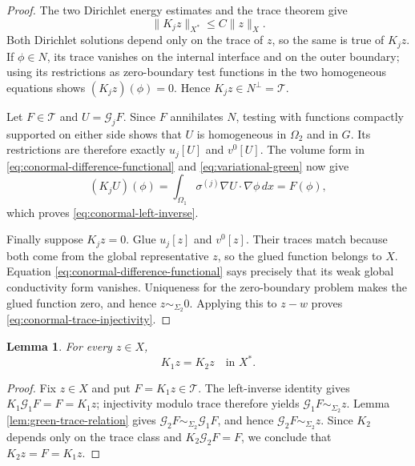\documentclass[11pt,oneside]{article}
\newtheorem{lemma}[theorem]{Lemma}
\begin{document}
\begin{proof}
The two Dirichlet energy estimates and the trace theorem give
\begin{equation}
  \|K_jz\|_{X^*}\le C\|z\|_X.
\end{equation}
Both Dirichlet solutions depend only on the
trace of \(z\), so the same is true of \(K_jz\).  If \(\phi\in N\), its trace
vanishes on the internal interface and on the outer boundary; using its
restrictions as zero-boundary test functions in the two homogeneous equations
shows \((K_jz)(\phi)=0\).  Hence \(K_jz\in N^\perp=\mathcal T\).

Let \(F\in\mathcal T\) and \(U=\mathcal G_jF\).  Since \(F\) annihilates
\(N\), testing with functions compactly supported on either side shows that
\(U\) is homogeneous in \(\Omega_2\) and in \(G\).  Its restrictions are
therefore exactly \(u_j[U]\) and \(v^0[U]\).  The volume form in
\eqref{eq:conormal-difference-functional} and
\eqref{eq:variational-green} now give
\begin{equation}
  (K_jU)(\phi)
  =\int_{\Omega_1}\sigma^{(j)}\nabla U\cdot\nabla\phi\,dx
  =F(\phi),
\end{equation}
which proves \eqref{eq:conormal-left-inverse}.

Finally suppose \(K_jz=0\).  Glue \(u_j[z]\) and \(v^0[z]\).  Their traces
match because both come from the global representative \(z\), so the glued
function belongs to \(X\).  Equation
\eqref{eq:conormal-difference-functional} says precisely that its weak global
conductivity form vanishes.  Uniqueness for the zero-boundary problem makes the
glued function zero, and hence \(z\sim_{\Sigma_2}0\).  Applying this to \(z-w\)
proves \eqref{eq:conormal-trace-injectivity}.
\end{proof}

\begin{lemma}
\label{lem:conormal-relations-equal}
For every \(z\in X\),
\begin{equation}
  K_1z=K_2z\quad\text{in }X^*.
  \label{eq:conormal-relations-equal}
\end{equation}
\end{lemma}

\begin{proof}
Fix \(z\in X\) and put \(F=K_1z\in\mathcal T\).  The left-inverse identity
gives \(K_1\mathcal G_1F=F=K_1z\); injectivity modulo trace therefore yields
\(\mathcal G_1F\sim_{\Sigma_2}z\).  Lemma \ref{lem:green-trace-relation} gives
\(\mathcal G_2F\sim_{\Sigma_2}\mathcal G_1F\), and hence
\(\mathcal G_2F\sim_{\Sigma_2}z\).  Since \(K_2\) depends only on the trace
class and \(K_2\mathcal G_2F=F\), we conclude that
\(K_2z=F=K_1z\).
\end{proof}
\end{document}
